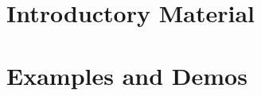 \chapter{Introductory Material}
\label{introChapter}

\chapter{Examples and Demos}
\label{examplesChapter}

